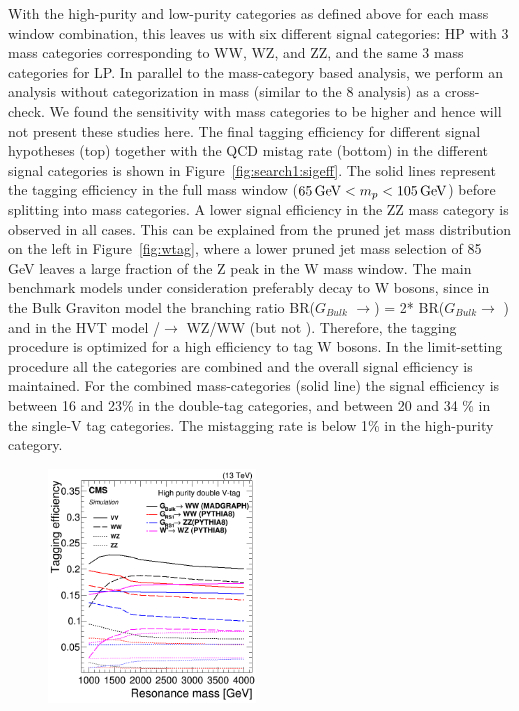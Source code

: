 With the high-purity and low-purity categories as defined above for each mass window combination, this leaves us with six different signal categories:  HP with 3 mass categories corresponding to WW, WZ, and ZZ, and the same 3 mass categories for LP. In parallel to the mass-category based analysis, we perform an analysis without categorization in mass (similar to the 8 \TeV analysis) as a cross-check. We found the sensitivity with mass categories to be higher and hence will not present these studies here. The final tagging efficiency for different signal hypotheses (top) together with the QCD mistag rate (bottom) in the different signal categories is shown in Figure~\ref{fig:search1:sigeff}. The solid lines represent the tagging efficiency in the full mass window ($65 {\,\text{Ge\hspace{-.08em}V}} < m_{p} < 105 {\,\text{Ge\hspace{-.08em}V}}$) before splitting into mass categories. A lower signal efficiency in the ZZ mass category is observed in all cases. This can be explained from the pruned jet mass distribution on the left in Figure~\ref{fig:wtag}, where a lower pruned jet mass selection of 85 GeV leaves a large fraction of the Z peak in the W mass window. The main benchmark models under consideration preferably decay to W bosons, since in the Bulk Graviton model the branching ratio BR($G_{Bulk}$ $\rightarrow$\WW) = 2* BR($G_{Bulk}$$\rightarrow$ \ZZ) and in the HVT model \PWpr/\PZpr$\rightarrow$ WZ/WW (but not \ZZ). Therefore, the tagging procedure is optimized for a high efficiency to tag W bosons. In the limit-setting procedure all the categories are combined and the overall signal efficiency is maintained. For the combined mass-categories (solid line) the signal efficiency is between 16 and 23\% in the double-tag categories, and between 20 and 34 \% in the single-V tag categories. The mistagging rate is below 1\% in the high-purity category.
\begin{figure}[h!]
\centering
\includegraphics[width=0.49\textwidth]{figures/analysis/search1/AN-15-211/HP_VV_SigEff.png}

\end{figure}$$
